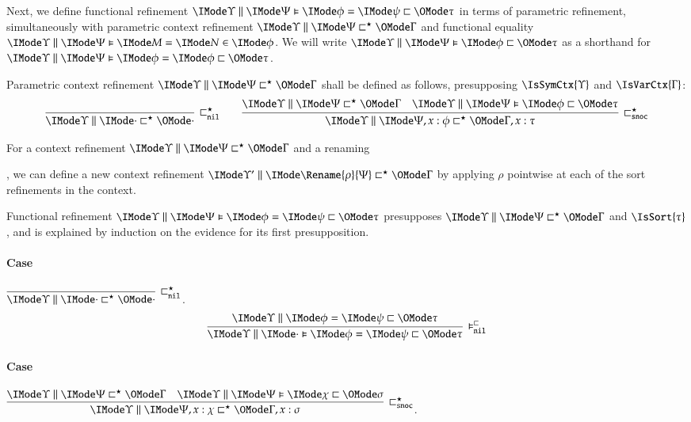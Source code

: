 \documentclass[11pt]{article}
\theoremstyle{definition}
\theoremstyle{notation}
\theoremstyle{remark}
\numberwithin{equation}{section}
\begin{document}
\newcommand\RefinesCtxNil{\sqsubset^\star_{\mathtt{nil}}}
\newcommand\RefinesCtxSnoc{\sqsubset^\star_{\mathtt{snoc}}}
\newcommand\PFunRefNil{\vDash^\sqsubset_{\mathtt{nil}}}
\newcommand\PFunRefSnoc{\vDash^\sqsubset_{\mathtt{snoc}}}

Next, we define functional refinement
$\FEqRefines{\Upsilon}{\Psi}{\phi}{\psi}{\tau}$ in terms of parametric refinement,
simultaneously with parametric context refinement
$\RefinesCtx{\Upsilon}{\Psi}{\Gamma}$ and functional equality
$\FRMemEq{\Upsilon}{\Psi}{M}{N}{\phi}$. We will write
$\FRefines{\Upsilon}{\Psi}{\phi}{\tau}$ as a shorthand for
$\FEqRefines{\Upsilon}{\Psi}{\phi}{\phi}{\tau}$.

\newcommand\DefRefinesCtxNil[1]{
  \infer[\RefinesCtxNil]{
    \RefinesCtx{#1}{\cdot}{\cdot}
  }{
  }
}
\newcommand\DefRefinesCtxSnoc[6]{
  \infer[\RefinesCtxSnoc]{
    \RefinesCtx{#1}{#2,#3:#4}{#5,#3:#6}
  }{
    \RefinesCtx{#1}{#2}{#5} &
    \FRefines{#1}{#2}{#4}{#6}
  }
}

Parametric context refinement $\RefinesCtx{\Upsilon}{\Psi}{\Gamma}$ shall be
defined as follows, presupposing $\IsSymCtx{\Upsilon}$ and
$\IsVarCtx{\Gamma}$:
\begin{gather*}
  \DefRefinesCtxNil{\Upsilon}\qquad
  \DefRefinesCtxSnoc{\Upsilon}{\Psi}{x}{\phi}{\Gamma}{\tau}
\end{gather*}

For a context refinement $\RefinesCtx{\Upsilon}{\Psi}{\Gamma}$ and a renaming
, we can define a new context refinement
$\RefinesCtx{\Upsilon'}{\Rename{\rho}{\Psi}}{\Gamma}$ by applying $\rho$ pointwise at
each of the sort refinements in the context.

Functional refinement $\FEqRefines{\Upsilon}{\Psi}{\phi}{\psi}{\tau}$ presupposes
$\RefinesCtx{\Upsilon}{\Psi}{\Gamma}$ and $\IsSort{\tau}$, and is explained by
induction on the evidence for its first presupposition.

\paragraph{Case} $\DefRefinesCtxNil{\Upsilon}$.
\[
  \infer[\PFunRefNil]{
    \FEqRefines{\Upsilon}{\cdot}{\phi}{\psi}{\tau}
  }{
    \EqRefines{\Upsilon}{\phi}{\psi}{\tau}
  }
\]

\paragraph{Case} $\DefRefinesCtxSnoc{\Upsilon}{\Psi}{x}{\chi}{\Gamma}{\sigma}$.
\end{document}
